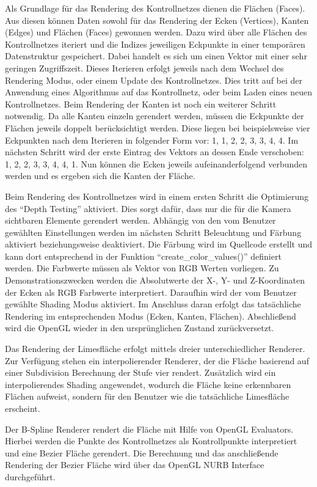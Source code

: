 Als Grundlage für das Rendering des Kontrollnetzes dienen die Flächen (Faces). Aus diesen können Daten sowohl für das Rendering der Ecken (Vertices), Kanten (Edges) und Flächen (Faces) gewonnen werden. Dazu wird über alle Flächen des Kontrollnetzes iteriert und die Indizes jeweiligen Eckpunkte in einer temporären Datenstruktur gespeichert. Dabei handelt es sich um einen Vektor mit einer sehr geringen Zugriffszeit. Dieses Iterieren erfolgt jeweils nach dem Wechsel des Rendering Modus, oder einem Update des Kontrollnetzes. Dies tritt auf bei der Anwendung eines Algorithmus auf das Kontrollnetz, oder beim Laden eines neuen Kontrollnetzes. Beim Rendering der Kanten ist noch ein weiterer Schritt notwendig. Da alle Kanten einzeln gerendert werden, müssen die Eckpunkte der Flächen jeweils doppelt berücksichtigt werden. Diese liegen bei beispielsweise vier Eckpunkten nach dem Iterieren in folgender Form vor: 1, 1, 2, 2, 3, 3, 4, 4. Im nächsten Schritt wird der erste Eintrag des Vektors an dessen Ende verschoben: 1, 2, 2, 3, 3, 4, 4, 1. Nun können die Ecken jeweils aufeinanderfolgend verbunden werden und es ergeben sich die Kanten der Fläche.

Beim Rendering des Kontrollnetzes wird in einem ersten Schritt die Optimierung des \enquote{Depth Testing} aktiviert. Dies sorgt dafür, dass nur die für die Kamera sichtbaren Elemente gerendert werden. Abhängig von den vom Benutzer gewählten Einstellungen werden im nächsten Schritt Beleuchtung und Färbung aktiviert beziehungsweise deaktiviert. Die Färbung wird im Quellcode erstellt und kann dort entsprechend in der Funktion \enquote{create\_color\_values()} definiert werden. Die Farbwerte müssen als Vektor von RGB Werten vorliegen. Zu Demonstrationszwecken werden die Absolutwerte der X-, Y- und Z-Koordinaten der Ecken als RGB Farbwerte interpretiert. Daraufhin wird der vom Benutzer gewählte Shading Modus aktiviert. Im Anschluss daran erfolgt das tatsächliche Rendering im entsprechenden Modus (Ecken, Kanten, Flächen). Abschließend wird die OpenGL wieder in den ursprünglichen Zustand zurückversetzt.

Das Rendering der Limesfläche erfolgt mittels dreier unterschiedlicher Renderer. Zur Verfügung stehen ein interpolierender Renderer, der die Fläche basierend auf einer Subdivision Berechnung der Stufe vier rendert. Zusätzlich wird ein interpolierendes Shading angewendet, wodurch die Fläche keine erkennbaren Flächen aufweist, sondern für den Benutzer wie die tatsächliche Limesfläche erscheint.

Der B-Spline Renderer rendert die Fläche mit Hilfe von OpenGL Evaluators. Hierbei werden die Punkte des Kontrollnetzes als Kontrollpunkte interpretiert und eine Bezier Fläche gerendert. Die Berechnung und das anschließende Rendering der Bezier Fläche wird über das OpenGL NURB Interface durchgeführt.

